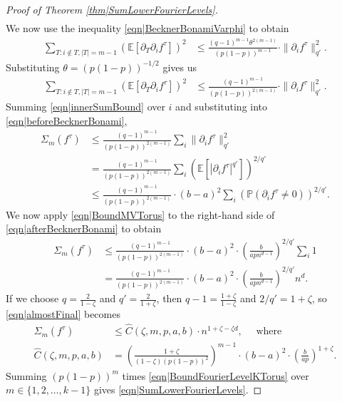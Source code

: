 \documentclass[reqno]{amsart}
\begin{document}
\begin{proof}[Proof of Theorem \ref{thm|SumLowerFourierLevels}]
\begin{align}
\nonumber 
\end{align}
We now use the inequality \eqref{eqn|BecknerBonamiVarphi} to obtain
\begin{align}
\sum_{T:i\not\in T, |T|=m-1} \left(\mathbb E\left[\partial_T\partial_i f^{\tau}\right]\right)^2
&\leq \frac{(q-1)^{m-1}\theta^{2(m-1)}}{(p(1-p))^{m-1}}\cdot \|\partial_i f^{\tau}\|_{q'}^2.
\nonumber
\end{align}
Substituting $\theta=(p(1-p))^{-1/2}$ gives us
\begin{align}
\sum_{T:i\not\in T, |T|=m-1} \left(\mathbb E\left[\partial_T\partial_i f^{\tau}\right]\right)^2
&\leq\frac{(q-1)^{m-1}}{(p(1-p))^{2(m-1)}}\cdot \|\partial_i f^{\tau}\|_{q'}^2.
\label{eqn|innerSumBound}
\end{align}
Summing \eqref{eqn|innerSumBound} over $i$ and substituting into \eqref{eqn|beforeBecknerBonami},
\begin{align}
\Sigma_m(f^{\tau})&\leq \frac{(q-1)^{m-1}}{(p(1-p))^{2(m-1)}}\sum_i \|\partial_i f^{\tau}\|_{q'}^2 \nonumber \\
&=\frac{(q-1)^{m-1}}{(p(1-p))^{2(m-1)}}\sum_i\left(\mathbb E\left[|\partial_i f^{\tau}|^{q'}\right]\right)^{2/q'} \nonumber \\
&\leq \frac{(q-1)^{m-1}}{(p(1-p))^{2(m-1)}}\cdot (b-a)^2\sum_i\left(\mathbb P\left( \partial_i f^{\tau}\neq 0\right)\right)^{2/q'}.
\label{eqn|afterBecknerBonami}
\end{align}
We now apply \eqref{eqn|BoundMVTorus} to the right-hand side of \eqref{eqn|afterBecknerBonami} to obtain
\begin{align}
\Sigma_m(f^{\tau})&\leq
\frac{(q-1)^{m-1}}{(p(1-p))^{2(m-1)}}\cdot (b-a)^2\cdot \left(\frac{b}{apn^{d-1}}\right)^{2/q'}\sum_i 1\nonumber\\
&=
\frac{(q-1)^{m-1}}{(p(1-p))^{2(m-1)}}\cdot (b-a)^2\cdot \left(\frac{b}{apn^{d-1}}\right)^{2/q'}n^d.\label{eqn|almostFinal}
\end{align}
If we choose $q=\frac{2}{1-\zeta}$ and $q'=\frac{2}{1+\zeta}$, then $q-1=\frac{1+\zeta}{1-\zeta}$ and $2/q'=1+\zeta$, so \eqref{eqn|almostFinal} becomes 
\begin{align}
\Sigma_m(f^{\tau})&\leq 
\hat C(\zeta,m,p,a,b)\cdot n^{1+\zeta-\zeta d},\quad\text{ where }\label{eqn|BoundFourierLevelKTorus}\\
\hat C(\zeta,m,p,a,b)&=\left(\frac{1+\zeta}{(1-\zeta)(p(1-p))^2}\right)^{m-1}\cdot (b-a)^2\cdot \left(\frac{b}{ap }\right)^{1+\zeta}.\nonumber
\end{align}
Summing $(p(1-p))^m$ times \eqref{eqn|BoundFourierLevelKTorus} over $m\in\{1,2,\dots,k-1\}$ gives \eqref{eqn|SumLowerFourierLevels}.
\end{proof}
\end{document}
